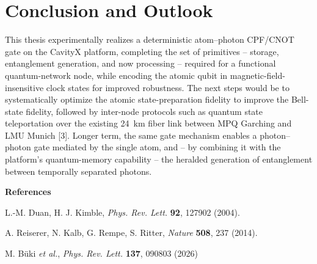 \documentclass[10pt,a4paper]{article}
\begin{document}
\section*{Conclusion and Outlook}

This thesis experimentally realizes a deterministic atom--photon CPF/CNOT gate on the CavityX platform, completing the set of primitives -- storage, entanglement generation, and now processing -- required for a functional quantum-network node, while encoding the atomic qubit in magnetic-field-insensitive clock states for improved robustness. The next steps would be to systematically optimize the atomic state-preparation fidelity to improve the Bell-state fidelity, followed by inter-node protocols such as quantum state teleportation over the existing \SI{24}{\kilo\metre} fiber link between MPQ Garching and LMU Munich [3]. Longer term, the same gate mechanism enables a photon--photon gate mediated by the single atom, and -- by combining it with the platform's quantum-memory capability -- the heralded generation of entanglement between temporally separated photons.

\vspace{0.3em}
{\small
	\textbf{References}
	\begin{enumerate}[label={[\arabic*]},leftmargin=2.0em,itemsep=0pt,topsep=2pt]
		\item L.-M. Duan, H. J. Kimble, \emph{Phys. Rev. Lett.} \textbf{92}, 127902 (2004).
		\item A. Reiserer, N. Kalb, G. Rempe, S. Ritter, \emph{Nature} \textbf{508}, 237 (2014).
		\item M. Büki \emph{et al.}, \emph{Phys. Rev. Lett.} \textbf{137}, 090803 (2026)
	\end{enumerate}
}
\end{document}
